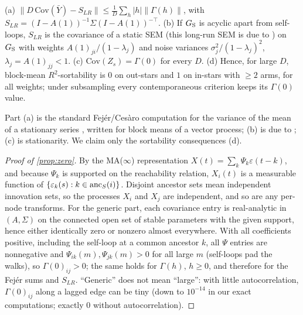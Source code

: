 \begin{theorem}\label{thm:agg}
(a) $\|D\,\mathrm{Cov}(\bar Y)-S_{LR}\|\le\frac1D\sum_h|h|\|\Gamma(h)\|$,
with $S_{LR}=(I-A(1))^{-1}\Sigma(I-A(1))^{-\top}$.
(b) If $G_{\mathrm S}$ is acyclic apart from self-loops, $S_{LR}$ is the covariance of a
static SEM (this long-run SEM is due to \citealp[Eqs.~(5), (10)]{gong2017aggregated}) on $G_{\mathrm S}$ with weights $A(1)_{ji}/(1-\lambda_j)$ and noise variances
$\sigma_j^2/(1-\lambda_j)^2$, $\lambda_j=A(1)_{jj}<1$.
(c) $\mathrm{Cov}(Z_s)=\Gamma(0)$ for every $D$.
(d) Hence, for large $D$, block-mean $R^2$-sortability is $0$ on out-stars and
$1$ on in-stars with $\ge2$ arms, for all weights; under subsampling every
contemporaneous criterion keeps its $\Gamma(0)$ value.
\end{theorem}
Part (a) is the standard Fej\'er/Ces\`aro computation for the variance of the
mean of a stationary series \citep[Ch.~7]{brockwell1991time}, written for
block means of a vector process; (b) is due to \citet{gong2017aggregated}; (c)
is stationarity. We claim only the sortability consequences (d).

\begin{proof}[Proof of \cref{prop:zero}]
By the MA($\infty$) representation $X(t)=\sum_k\Psi_k\varepsilon(t-k)$, and
because $\Psi_k$ is supported on the reachability relation, $X_i(t)$ is a
measurable function of $\{\varepsilon_k(s):k\in\mathrm{anc}_S(i)\}$. Disjoint ancestor
sets mean independent innovation sets, so the processes $X_i$ and $X_j$ are
independent, and so are any per-node transforms. For the generic part, each
covariance entry is real-analytic in $(A,\Sigma)$ on the connected open set of
stable parameters with the given support, hence either identically zero or
nonzero almost everywhere. With all coefficients positive, including the
self-loop at a common ancestor $k$, all $\Psi$ entries are nonnegative and
$\Psi_{ik}(m),\Psi_{jk}(m)>0$ for all large $m$ (self-loops pad the walks), so
$\Gamma(0)_{ij}>0$; the same holds for $\Gamma(h)$, $h\ge0$, and therefore for
the Fej\'er sums and $S_{LR}$. ``Generic'' does not mean ``large'': with little
autocorrelation, $\Gamma(0)_{ij}$ along a lagged edge can be tiny (down to
$10^{-14}$ in our exact computations; exactly $0$ without autocorrelation).
\end{proof}

